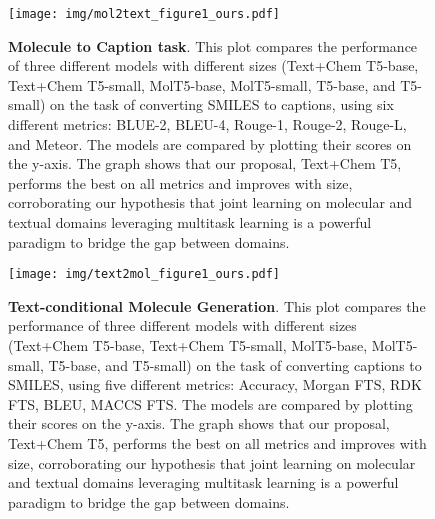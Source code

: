 \documentclass[nohyperref]{article}
\theoremstyle{plain}
\theoremstyle{definition}
\theoremstyle{remark}
\begin{document}
\begin{figure}[ht]
    \centering
\texttt{[image: img/mol2text\_figure1\_ours.pdf]}
    \caption{\textbf{Molecule to Caption task}.
    This plot compares the performance of three different models with different sizes (Text+Chem T5-base, Text+Chem T5-small, MolT5-base, MolT5-small, T5-base, and T5-small) on the task of converting SMILES to captions, using six different metrics: BLUE-2, BLEU-4, Rouge-1, Rouge-2, Rouge-L, and Meteor. The models are compared by plotting their scores on the y-axis. The graph shows that our proposal, Text+Chem T5, performs the best on all metrics and improves with size, corroborating our hypothesis that joint learning on molecular and textual domains leveraging multitask learning is a powerful paradigm to bridge the gap between domains.}
    \label{fig:mol2text_figure1-appx}
\end{figure}

\begin{figure}[ht]
    \centering
\texttt{[image: img/text2mol\_figure1\_ours.pdf]}
    \caption{\textbf{Text-conditional Molecule Generation}.
    This plot compares the performance of three different models with different sizes (Text+Chem T5-base, Text+Chem T5-small, MolT5-base, MolT5-small, T5-base, and T5-small) on the task of converting captions to SMILES, using five different metrics: Accuracy, Morgan FTS, RDK FTS, BLEU, MACCS FTS. The models are compared by plotting their scores on the y-axis. The graph shows that our proposal, Text+Chem T5, performs the best on all metrics and improves with size, corroborating our hypothesis that joint learning on molecular and textual domains leveraging multitask learning is a powerful paradigm to bridge the gap between domains.}
    \label{fig:text2mol_figure1-appx}
\end{figure}






\clearpage
\end{document}
